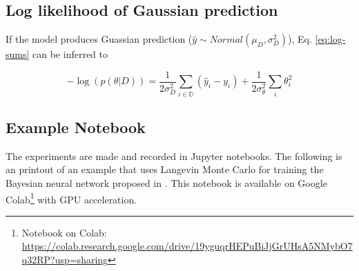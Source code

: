\documentclass{article}
\begin{document}
\subsection{Log likelihood of Gaussian prediction\label{sec:gaus-pred}}

If the model produces Guassian prediction ($\hat{y} \sim Normal(\mu_D, \sigma^{2}_{D})$), Eq. \ref{eq:log-sums} can be inferred to 

\begin{equation}
    -\log(p(\theta |D)) = \frac{1}{2\sigma^{2}_{D}} \sum_{i \in \mathbb{D}}(\hat{y}_i - y_i) + \frac{1}{2\sigma^{2}_{\theta}} \sum_{i}\theta_{i}^{2}
\end{equation}


\subsection{Example Notebook\label{sec:notebook}}

The experiments are made and recorded in Jupyter notebooks. The following is an printout of an example that uses Langevin Monte Carlo for training the Bayesian neural network proposed in \cite{chandra2021bayesian}. This notebook is available on Google Colab\footnote{Notebook on Colab: \url{https://colab.research.google.com/drive/19yguqrHEPuBiJjGrUHsA5NMybO7q32RP?usp=sharing}} with GPU acceleration.



\end{document}
